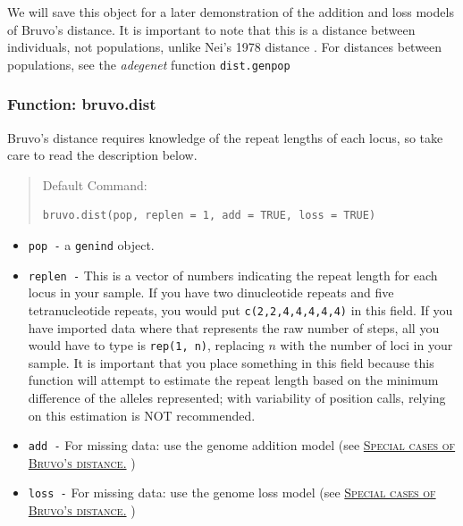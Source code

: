 \documentclass[letterpaper]{article}\usepackage[]{graphicx}\usepackage[]{color}
\makeatletter
\newenvironment{kframe}{%
 \def\at@end@of@kframe{}%
 \ifinner\ifhmode%
  \def\at@end@of@kframe{\end{minipage}}%
  \begin{minipage}{\columnwidth}%
 \fi\fi%
 \def\FrameCommand##1{\hskip\@totalleftmargin \hskip-\fboxsep
 \colorbox{shadecolor}{##1}\hskip-\fboxsep
     \hskip-\linewidth \hskip-\@totalleftmargin \hskip\columnwidth}%
 \MakeFramed {\advance\hsize-\width
   \@totalleftmargin\z@ \linewidth\hsize
   \@setminipage}}%
 {\par\unskip\endMakeFramed%
 \at@end@of@kframe}
\newenvironment{knitrout}{}{} %
\newcommand{\tab}{\hspace*{1em}}
\newcommand{\seclink}[2]{
  \textsc{\hyperref[#1]{#2}}
}
\newcommand{\adegenet}{\textit{adegenet}}
\makeatother
\begin{document}
We will save this object for a later demonstration of the addition and loss models of Bruvo's distance. It is important to note that this is a distance between individuals, not populations, unlike Nei's 1978 distance \cite{Nei:1978}. For distances between populations, see the \adegenet{} function \texttt{dist.genpop}

\subsubsection{Function: bruvo.dist}
\label{index:bruvo:bruvo.dist}

\tab\tab Bruvo's distance requires knowledge of the repeat lengths of each locus, so take care to read the description below.
\begin{quote}
Default Command:
\begin{knitrout}
\color{fgcolor}\begin{kframe}
\begin{verbatim}
bruvo.dist(pop, replen = 1, add = TRUE, loss = TRUE)
\end{verbatim}
\end{kframe}
\end{knitrout}

\end{quote}
\begin{itemize}
  \item \texttt{pop -} a \texttt{genind} object.
  \item \texttt{replen -} This is a vector of numbers indicating the repeat length for each locus in your sample. If you have two dinucleotide repeats and five tetranucleotide repeats, you would put \texttt{c(2,2,4,4,4,4,4)} in this field. If you have imported data where that represents the raw number of steps, all you would have to type is \texttt{rep(1, n)}, replacing $n$ with the number of loci in your sample. It is important that you place something in this field because this function will attempt to estimate the repeat length based on the minimum difference of the alleles represented; with variability of position calls, relying on this estimation is NOT recommended. 
  \item \texttt{add -} For missing data: use the genome addition model (see\seclink{appendix:algorithm:bruvospecial}{Special cases of Bruvo's distance.})
  \item \texttt{loss -} For missing data: use the genome loss model (see\seclink{appendix:algorithm:bruvospecial}{Special cases of Bruvo's distance.})
\end{itemize}
\end{document}
